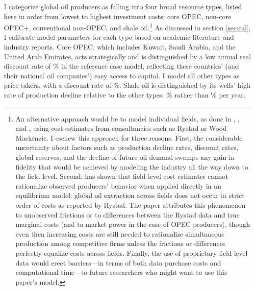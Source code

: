 \documentclass[12pt]{article}
\begin{document}
I categorize global oil producers as falling into four broad resource types, listed here in order from lowest to highest investment costs: core OPEC, non-core OPEC+, conventional non-OPEC, and shale oil.\footnote{An alternative approach would be to model individual fields, as done in \cite{AskerEtAl2019}, \cite{healschlenker}, and \cite{BornsteinEtAl2023}, using cost estimates from consultancies such as Rystad or Wood Mackenzie. I eschew this approach for three reasons. First, the considerable uncertainty about factors such as production decline rates, discount rates, global reserves, and the decline of future oil demand swamps any gain in fidelity that would be achieved by modeling the industry all the way down to the field level. Second, \cite{AskerEtAl2019} has shown that field-level cost estimates cannot rationalize observed producers' behavior when applied directly in an equilibrium model: global oil extraction across fields does not occur in strict order of costs as reported by Rystad. The paper attributes this phenomenon to unobserved frictions or to differences between the Rystad data and true marginal costs (and to market power in the case of OPEC producers), though even then increasing costs are still needed to rationalize simultaneous production among competitive firms unless the frictions or differences perfectly equalize costs across fields. Finally, the use of proprietary field-level data would erect barriers---in terms of both data purchase costs and computational time---to future researchers who might want to use this paper's model.} As discussed in section \ref{sec:cal}, I calibrate model parameters for each type based on academic literature and industry reports. Core OPEC, which includes Kuwait, Saudi Arabia, and the United Arab Emirates, acts strategically and is distinguished by a low annual real discount rate of \unskip\% in the reference case model, reflecting these countries' (and their national oil companies') easy access to capital. I model all other types as price-takers, with a discount rate of \unskip\%. Shale oil is distinguished by its wells' high rate of production decline relative to the other types: \unskip\% rather than \unskip\% per year. 
 
\end{document}
